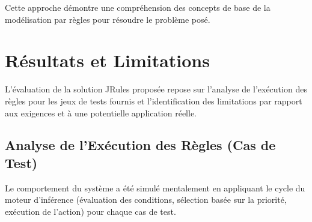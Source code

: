 \documentclass[11pt,a4paper]{article}
\begin{document}
Cette approche démontre une compréhension des concepts de base de la modélisation par règles pour résoudre le problème posé.

\section{Résultats et Limitations}
\label{sec:resultats_limitations}

L'évaluation de la solution JRules proposée repose sur l'analyse de l'exécution des règles pour les jeux de tests fournis et l'identification des limitations par rapport aux exigences et à une potentielle application réelle.

\subsection{Analyse de l'Exécution des Règles (Cas de Test)}

Le comportement du système a été simulé mentalement en appliquant le cycle du moteur d'inférence (évaluation des conditions, sélection basée sur la priorité, exécution de l'action) pour chaque cas de test.
\end{document}
